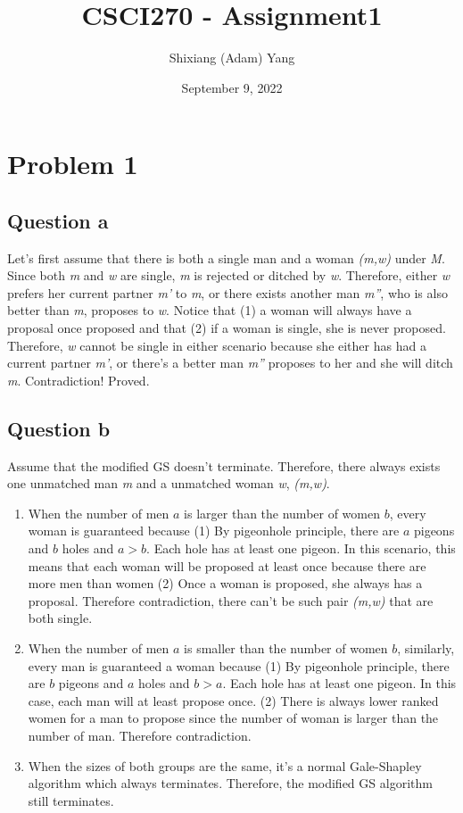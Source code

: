 \documentclass{article}
\author{Shixiang (Adam) Yang}
\date{September 9, 2022}
\title{CSCI270 - Assignment1}
\begin{document}
 \maketitle
\section{Problem 1}

    \subsection{Question a}

    Let's first assume that there is both a single man and a woman \textit{(m,w)} under \textit{M}. Since both \textit{m} and \textit{w} are single, \textit{m} is rejected or ditched by \textit{w}. Therefore, either \textit{w} prefers her current partner \textit{m'} to \textit{m}, or there exists another man \textit{m''}, who is also better than \textit{m}, proposes to \textit{w}. Notice that (1) a woman will always have a proposal once proposed and that (2) if a woman is single, she is never proposed. Therefore, \textit{w} cannot be single in either scenario because she either has had a current partner \textit{m'}, or there's a better man \textit{m''} proposes to her and she will ditch \textit{m}. Contradiction! Proved.
    
    \subsection{Question b}
    Assume that the modified GS doesn't terminate. Therefore, there always exists one unmatched man \textit{m} and a unmatched woman \textit{w}, \textit{(m,w)}. 
    \begin{enumerate}
        \item When the number of men $a$ is larger than the number of women $b$, every woman is guaranteed because (1) By pigeonhole principle, there are $a$ pigeons and $b$ holes and $a>b$. Each hole has at least one pigeon. In this scenario, this means that each woman will be proposed at least once because there are more men than women (2) Once a woman is proposed, she always has a proposal. Therefore contradiction, there can't be such pair \textit{(m,w)} that are both single.
        \item When the number of men $a$ is smaller than the number of women $b$, similarly, every man is guaranteed a woman because (1) By pigeonhole principle, there are $b$ pigeons and $a$ holes and $b>a$. Each hole has at least one pigeon. In this case, each man will at least propose once. (2) There is always lower ranked women for a man to propose since the number of woman is larger than the number of man. Therefore contradiction.
        \item When the sizes of both groups are the same, it's a normal Gale-Shapley algorithm which always terminates. Therefore, the modified GS algorithm still terminates.
    \end{enumerate}
\end{document}
